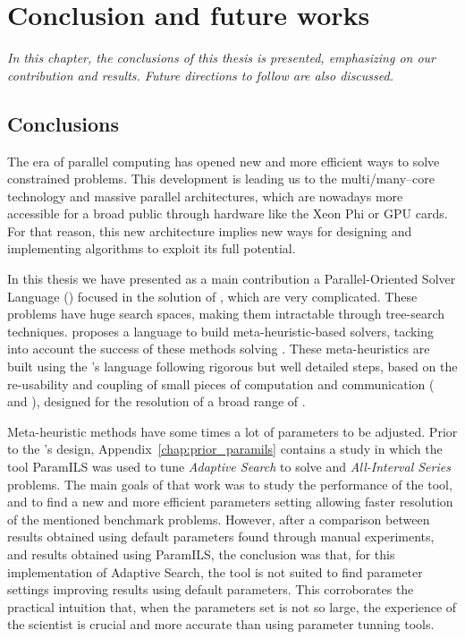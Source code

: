 \chapter{Conclusion and future works}
\label{chap:conclusion}
\textit{In this chapter, the conclusions of this thesis is presented, emphasizing on our contribution and results. Future directions to follow are also discussed.}
\vfill
\minitoc
\newpage

\section{Conclusions}
\label{sec:conclusion_conclusion}

The era of parallel computing has opened new and more efficient ways to solve constrained problems. This development is leading us to the multi/many--core technology and massive parallel architectures, which are nowadays more accessible for a broad public through hardware like the Xeon Phi or GPU cards. For that reason, this new architecture implies new ways for designing and implementing algorithms to exploit its full potential.

In this thesis we have presented as a main contribution a Parallel-Oriented Solver Language (\posl) focused in the solution of \CSPs, which are very complicated. These problems have huge search spaces, making them intractable through tree-search techniques. \posl{} proposes a language to build meta-heuristic-based solvers, tacking into account the success of these methods solving \csps{}. These meta-heuristics are built using the \posl's language following rigorous but well detailed steps, based on the re-usability and coupling of small pieces of computation and communication (\oms{} and \opchs), designed for the resolution of a broad range of \csps. 

Meta-heuristic methods have some times a lot of parameters to be adjusted. Prior to the \posl{}'s design, Appendix~\ref{chap:prior_paramils} contains a study in which the tool {\sc ParamILS} was used to tune {\it Adaptive Search} to solve \carr{} and {\it All-Interval Series} problems. The main goals of that work was to study the performance of the tool, and to find a new and more efficient parameters setting allowing faster resolution of the mentioned benchmark problems. However, after a comparison between results obtained using default parameters found through manual experiments, and results obtained using {\sc ParamILS}, the conclusion was that, for this implementation of Adaptive Search, the tool is not suited to find parameter settings improving results using default parameters. This corroborates the practical intuition that, when the parameters set is not so large, the experience of the scientist is crucial and more accurate than using parameter tunning tools.


